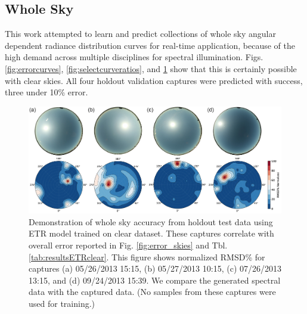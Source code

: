 \subsection{Whole Sky}

This work attempted to learn and predict collections of whole sky angular dependent radiance distribution curves for real-time application, because of the high demand across multiple disciplines for spectral illumination. Figs. \ref{fig:errorcurves}, \ref{fig:selectcurveratios}, and \ref{fig:wholesky} show that this is certainly possible with clear skies. All four holdout validation captures were predicted with success, three under 10\% error.

\begin{figure} [hbtp]
\begin{center}
\includegraphics[width=1.0\textwidth]{img/results_wholeskyerrors.jpg}
\end{center}
\caption[wholesky] { \label{fig:wholesky}Demonstration of whole sky accuracy from holdout test data using ETR model trained on clear dataset. These captures correlate with overall error reported in Fig. \ref{fig:error_skies} and Tbl. \ref{tab:resultsETRclear}. This figure shows normalized RMSD\% for captures (a) 05/26/2013 15:15, (b) 05/27/2013 10:15, (c) 07/26/2013 13:15, and (d) 09/24/2013 15:39. We compare the generated spectral data with the captured data. (No samples from these captures were used for training.)}
\end{figure}
